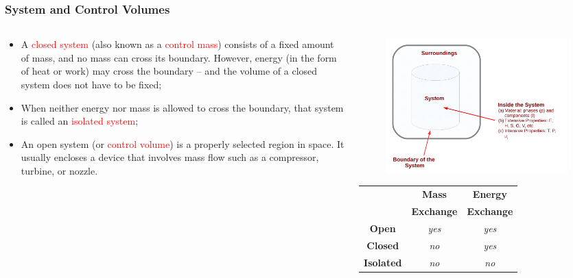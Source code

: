 \documentclass[10pt,compress,handout,ignorenonframetext]{beamer}
\begin{document}
\scriptsize
\begin{frame}
 \frametitle{System and Control Volumes}
  \begin{columns}
    \begin{column}[l]{0.55\linewidth}
      \begin{itemize}%
       \item <1-> A \textcolor{red}{closed system} (also known as a \textcolor{red}{control mass}) consists of a fixed amount of mass, and no mass can cross its boundary. However, energy (in the form of heat or work) may cross the boundary -- and the volume of a closed system does not have to be fixed; 
       \item <2-> When neither energy nor mass is allowed to cross the boundary, that system is called an \textcolor{red}{isolated system};
       \item <3-> An open system (or \textcolor{red}{control volume}) is a properly selected region in space. It usually encloses a device that involves mass flow such as a compressor, turbine, or nozzle.
      \end{itemize}
    \end{column}
    \begin{column}[l]{0.45\linewidth}\scriptsize
      \begin{figure}%
        \begin{center}
          \includegraphics[width=1.05\columnwidth,clip]{./Pics/Fig_SystemDefinition}
        \end{center}
      \end{figure}
      \begin{tabular}{|c|c|c|}
         \hline
                      & {\bf Mass} & {\bf Energy} \\
                      & {\bf Exchange} & {\bf Exchange} \\
         \hline
         {\bf Open}   & {\it yes}  & {\it yes}    \\
         {\bf Closed} & {\it no}   & {\it yes}    \\
         {\bf Isolated}&{\it no}   & {\it no}     \\
         \hline 
      \end{tabular}    
    \end{column}
  \end{columns}
\end{frame}
\end{document}

